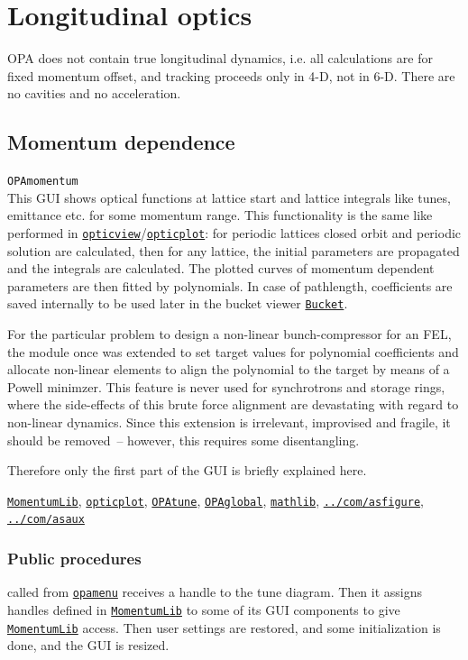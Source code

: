 \documentclass[12pt]{article}
\newcommand\code[1]{{\tt #1}}
\newcommand\guico[1]{{\color{blue}\code{#1}}}
\newcommand{\opagui}[1]{\colorbox{blue!20}{\code{#1}}}
\newcommand{\oguih}[2]{\subsection{\label{#2}#1}{\Huge\opagui{#2}}\\}
\newcommand{\ogui}[1]{\hyperref[#1]{\opagui{#1}}}
\newcommand{\opaguif}[1]{\colorbox{violet!30}{\code{#1}}}
\newcommand{\oguif}[1]{\hyperref[#1]{\opaguif{#1}}}
\newcommand{\opauni}[1]{\colorbox{orange!30}{\code{#1}}}
\newcommand{\ouni}[1]{\hyperref[#1]{\opauni{#1}}}
\newcommand{\uses}[1]{\flushleft {\bf Uses:} #1}
\newcommand{\desc}[1]{#1}
\newcommand{\ppro}[1]{\subsubsection*{Public procedures} #1}
\newcommand{\todo}[1]{{\color{red} #1}}
\begin{document}
\section{\label{secmomo}Longitudinal optics}
OPA does not contain true longitudinal dynamics, i.e. all calculations are for fixed momentum offset, and tracking proceeds only in 4-D, not in 6-D. There are no cavities and no acceleration.


\oguih{Momentum dependence}{OPAmomentum}

\desc{This GUI shows optical functions at lattice start and lattice integrals like tunes, emittance etc. for some momentum range. This functionality is the same like performed in \ogui{opticview}/\ouni{opticplot}: for periodic lattices closed orbit and periodic solution are calculated, then for any lattice, the initial parameters are propagated and the integrals are calculated. The plotted curves of momentum dependent parameters are then fitted by polynomials. In case of pathlength, coefficients are saved internally to be used later in the bucket viewer \ogui{Bucket}.

\todo{For the particular problem to design a non-linear bunch-compressor for an FEL, the module once was extended to set target values for polynomial coefficients and allocate non-linear elements to align the polynomial to the target by means of a Powell minimzer. This feature is never used for synchrotrons and storage rings, where the side-effects of this brute force alignment are devastating with regard to non-linear dynamics. Since this extension is irrelevant, improvised and fragile, it should be removed~-- however, this requires some disentangling.}

Therefore only the first part of the GUI is briefly explained here.
}

\uses{\ouni{MomentumLib}, \ouni{opticplot}, \ogui{OPAtune}, \ouni{OPAglobal}, \ouni{mathlib}, \oguif{../com/asfigure}, \ouni{../com/asaux}} 

\ppro{
\guico{Start} called from \ogui{opamenu} receives a handle to the tune diagram. Then it assigns handles defined in \ouni{MomentumLib} to some of its GUI components to give \ouni{MomentumLib} access. Then user settings are restored, and some initialization is done, and the GUI is resized.
}
\end{document}
